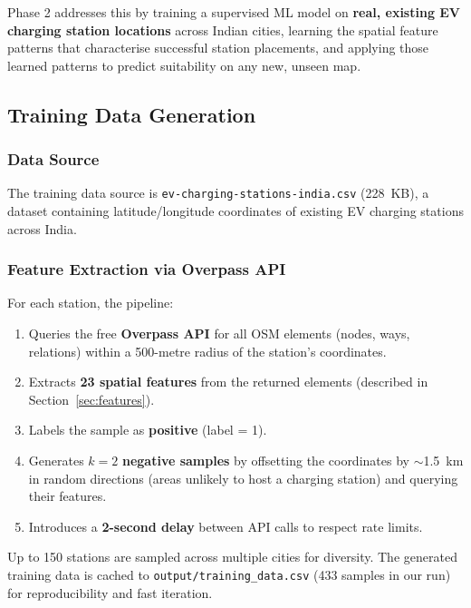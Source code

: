 \documentclass[12pt, a4paper]{article}
\begin{document}
Phase 2 addresses this by training a supervised ML model on 
\textbf{real, existing EV charging station locations} across Indian 
cities, learning the spatial feature patterns that characterise 
successful station placements, and applying those learned patterns 
to predict suitability on any new, unseen map.

\subsection{Training Data Generation}

\subsubsection{Data Source}

The training data source is \texttt{ev-charging-stations-india.csv} 
(228~KB), a dataset containing latitude/longitude coordinates of 
existing EV charging stations across India.

\subsubsection{Feature Extraction via Overpass API}

For each station, the pipeline:

\begin{enumerate}
    \item Queries the free \textbf{Overpass API} for all OSM elements 
    (nodes, ways, relations) within a 500-metre radius of the 
    station's coordinates.
    \item Extracts \textbf{23 spatial features} from the returned 
    elements (described in Section~\ref{sec:features}).
    \item Labels the sample as \textbf{positive} (label = 1).
    \item Generates $k = 2$ \textbf{negative samples} by offsetting 
    the coordinates by $\sim$1.5~km in random directions (areas 
    unlikely to host a charging station) and querying their features.
    \item Introduces a \textbf{2-second delay} between API calls 
    to respect rate limits.
\end{enumerate}

Up to 150 stations are sampled across multiple cities for diversity. 
The generated training data is cached to 
\texttt{output/training\_data.csv} (433 samples in our run) for 
reproducibility and fast iteration.
\end{document}
